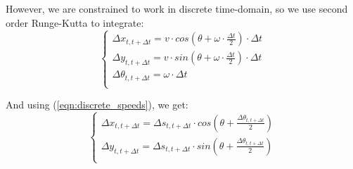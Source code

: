 \documentclass[a4paper]{article}
\begin{document}
However, we are constrained to work in discrete time-domain, so we use second order Runge-Kutta to integrate:
\begin{equation}
\left\{
\begin{array}{lcl}
    \Delta x_{t,t+\Delta t} = v \cdot cos(\theta + \omega \cdot \frac{\Delta t}{2}) \cdot \Delta t \\
    \Delta y_{t,t+\Delta t} = v \cdot sin(\theta + \omega \cdot \frac{\Delta t}{2}) \cdot \Delta t \\
    \Delta \theta_{t,t+\Delta t} = \omega \cdot \Delta t \\
\end{array}
\right.
\end{equation}

And using (\ref{eqn:discrete_speeds}), we get:
\begin{equation}
\left\{
\begin{array}{lcl}
    \Delta x_{t,t+\Delta t} = \Delta s_{t,t+\Delta t} \cdot cos(\theta + \frac{\Delta \theta_{t,t+\Delta t}}{2}) \\
    \Delta y_{t,t+\Delta t} = \Delta s_{t,t+\Delta t} \cdot sin(\theta + \frac{\Delta \theta_{t,t+\Delta t}}{2}) \\
\end{array}
\right.
\end{equation}
\end{document}
